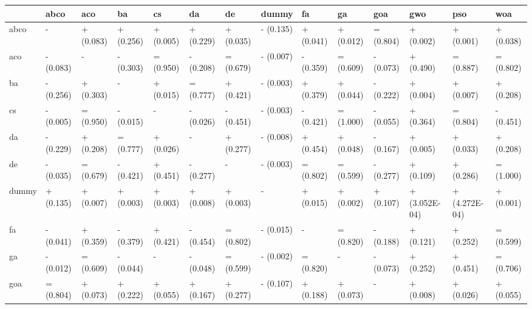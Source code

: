 \begin{table}
    \centering
    \begin{adjustbox}{width=\linewidth}
        \begin{tabular}{llllllllllllll}
            \toprule
            {}    & abco      & aco       & ba        & cs        & da        & de        & dummy         & fa        & ga        & goa       & gwo           & pso           & woa       \\
            \midrule
            abco  & -         & + (0.083) & + (0.256) & + (0.005) & + (0.229) & + (0.035) & - (0.135)     & + (0.041) & + (0.012) & = (0.804) & + (0.002)     & + (0.001)     & + (0.038) \\
            aco   & - (0.083) & -         & - (0.303) & = (0.950) & - (0.208) & = (0.679) & - (0.007)     & - (0.359) & = (0.609) & - (0.073) & + (0.490)     & = (0.887)     & = (0.802) \\
            ba    & - (0.256) & + (0.303) & -         & + (0.015) & = (0.777) & + (0.421) & - (0.003)     & + (0.379) & + (0.044) & - (0.222) & + (0.004)     & + (0.007)     & + (0.208) \\
            cs    & - (0.005) & = (0.950) & - (0.015) & -         & - (0.026) & - (0.451) & - (0.003)     & - (0.421) & = (1.000) & - (0.055) & + (0.364)     & = (0.804)     & - (0.451) \\
            da    & - (0.229) & + (0.208) & = (0.777) & + (0.026) & -         & + (0.277) & - (0.008)     & + (0.454) & + (0.048) & - (0.167) & + (0.005)     & + (0.033)     & + (0.208) \\
            de    & - (0.035) & = (0.679) & - (0.421) & + (0.451) & - (0.277) & -         & - (0.003)     & = (0.802) & = (0.599) & - (0.277) & + (0.109)     & + (0.286)     & = (1.000) \\
            dummy & + (0.135) & + (0.007) & + (0.003) & + (0.003) & + (0.008) & + (0.003) & -             & + (0.015) & + (0.002) & + (0.107) & + (3.052E-04) & + (4.272E-04) & + (0.001) \\
            fa    & - (0.041) & + (0.359) & - (0.379) & + (0.421) & - (0.454) & = (0.802) & - (0.015)     & -         & = (0.820) & - (0.188) & + (0.121)     & + (0.252)     & = (0.599) \\
            ga    & - (0.012) & = (0.609) & - (0.044) & -         & - (0.048) & = (0.599) & - (0.002)     & = (0.820) & -         & - (0.073) & + (0.252)     & + (0.451)     & = (0.706) \\
            goa   & = (0.804) & + (0.073) & + (0.222) & + (0.055) & + (0.167) & + (0.277) & - (0.107)     & + (0.188) & + (0.073) & -         & + (0.008)     & + (0.026)     & + (0.055) \\

\end{tabular}
\end{adjustbox}
\end{table}
